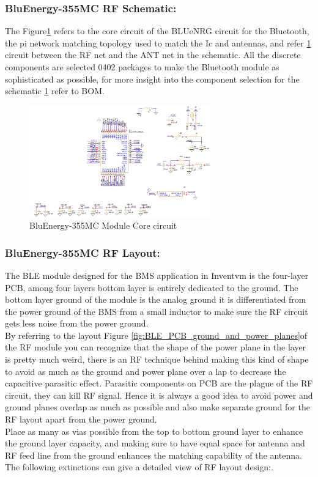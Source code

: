 \subsubsection{BluEnergy-355MC RF Schematic:}
The Figure\ref{fig:STM_BLE_Schematic} refers to the core circuit of the BLUeNRG circuit for the Bluetooth, the pi network matching topology used to match the Ic and antennas, and refer \ref{fig:STM_BLE_Schematic} circuit between the RF net and the ANT net in the schematic.
All the discrete components are selected 0402 packages to make the Bluetooth module as sophisticated as possible, for more insight into the component selection for the schematic \ref{fig:STM_BLE_Schematic} refer to BOM\cite{BLNRG355_STEVAL_BOM}.
\begin{figure}[h]
	\centering
	\includegraphics[width=0.7\textwidth]{Chap03/Figures/STM_BLE_Schematic.PNG}
	\caption{BluEnergy-355MC Module Core circuit }
	\label{fig:STM_BLE_Schematic}
\end{figure}

\subsubsection{BluEnergy-355MC RF Layout:}
The BLE module designed for the BMS application in Inventvm is the four-layer PCB, among four layers bottom layer is entirely dedicated to the ground. The bottom layer ground of the module is the analog ground it is differentiated from the power ground of the BMS from a small inductor to make sure the RF circuit gets less noise from the power ground. \\
\indent By referring to the layout Figure \ref{fig:BLE_PCB_ground_and_power_planes}of the RF module you can recognize that the shape of the power plane in the layer is pretty much weird, there is an RF technique behind making this kind of shape to avoid as much as the ground and power plane over a lap to decrease the capacitive parasitic effect. Parasitic components on PCB are the plague of the RF circuit, they can kill RF signal. Hence it is always a good idea to avoid power and ground planes overlap as much as possible and also make separate ground for the RF layout apart from the power ground.\\
\indent Place as many as vias possible from the top to bottom ground layer to enhance the ground layer capacity, and making sure to have equal space for antenna and RF feed line from the ground enhances the matching capability of the antenna. The following extinctions can give a detailed view of RF layout design:.

